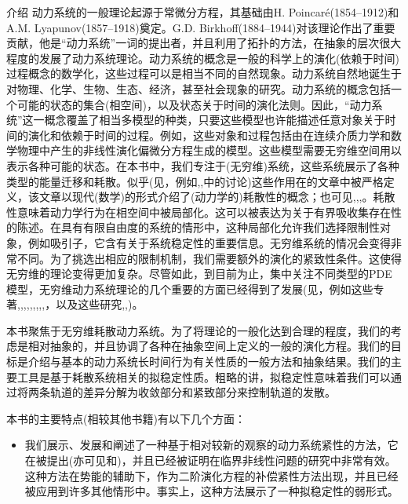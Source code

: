 \begin{PreChapter}{介\quad 绍}
	动力系统的一般理论起源于常微分方程，其基础由H. Poincaré(1854–1912)和A.M. Lyapunov(1857–1918)奠定。G.D. Birkhoff(1884–1944)对该理论作出了重要贡献，他是“动力系统”一词的提出者，并且利用了拓扑的方法，在抽象的层次很大程度的发展了动力系统理论。动力系统的概念是一般的科学上的演化(依赖于时间)过程概念的数学化，这些过程可以是相当不同的自然现象。动力系统自然地诞生于对物理、化学、生物、生态、经济，甚至社会现象的研究。动力系统的概念包括一个可能的状态的集合(相空间)，以及状态关于时间的演化法则。因此，“动力系统”这一概念覆盖了相当多模型的种类，只要这些模型也许能描述任意对象关于时间的演化和依赖于时间的过程。例如，这些对象和过程包括由在连续介质力学和数学物理中产生的非线性演化偏微分方程生成的模型。这些模型需要无穷维空间用以表示各种可能的状态。在本书中，我们专注于(无穷维)系统，这些系统展示了各种类型的能量迁移和耗散。似乎(见，例如\cite{Hale88},\cite{Raugel02},\cite{Temam97}中的讨论)这些作用在\cite{Levinson45}的文章中被严格定义，该文章以现代(数学)的形式介绍了(动力学的)耗散性的概念；也可见\cite{Billoti71},\cite{Coddington55},\cite{Pliss66},\cite{Pliss77}。耗散性意味着动力学行为在相空间中被局部化。这可以被表达为关于有界吸收集存在性的陈述。在具有有限自由度的系统的情形中，这种局部化允许我们选择限制性对象，例如吸引子，它含有关于系统稳定性的重要信息。无穷维系统的情况会变得非常不同。为了挑选出相应的限制机制，我们需要额外的演化的紧致性条件。这使得无穷维的理论变得更加复杂。尽管如此，到目前为止，集中关注不同类型的PDE模型，无穷维动力系统理论的几个重要的方面已经得到了发展(见，例如这些专著\cite{Babin92},\cite{Chepyzhov02},\cite{Chueshov99},\cite{Chueshov10},\cite{Chueshov08},\cite{Hale88},\cite{Ladyzhenskaya91},\cite{Robinson01},\cite{Sell02},\cite{Temam97}，以及这些研究\cite{Babin06},\cite{Miranville08},\cite{Raugel02})。
	
	本书聚焦于无穷维耗散动力系统。为了将理论的一般化达到合理的程度，我们的考虑是相对抽象的，并且协调了各种在抽象空间上定义的一般的演化方程。我们的目标是介绍与基本的动力系统长时间行为有关性质的一般方法和抽象结果。我们的主要工具是基于耗散系统相关的拟稳定性质。粗略的讲，拟稳定性意味着我们可以通过将两条轨道的差异分解为收敛部分和紧致部分来控制轨道的发散。
	
	本书的主要特点(相较其他书籍)有以下几个方面：

	\begin{itemize}
		\item 我们展示、发展和阐述了一种基于相对较新的观察的动力系统紧性的方法，它在\cite{Khanmamedov06}被提出(亦可见\cite{Chueshov08}和\cite{Chueshov10})，并且已经被证明在临界非线性问题的研究中非常有效。这种方法在势能的辅助下，作为二阶演化方程的补偿紧性方法出现，并且已经被应用到许多其他情形中。事实上，这种方法展示了一种拟稳定性的弱形式。
		

\end{itemize}
\end{PreChapter}
